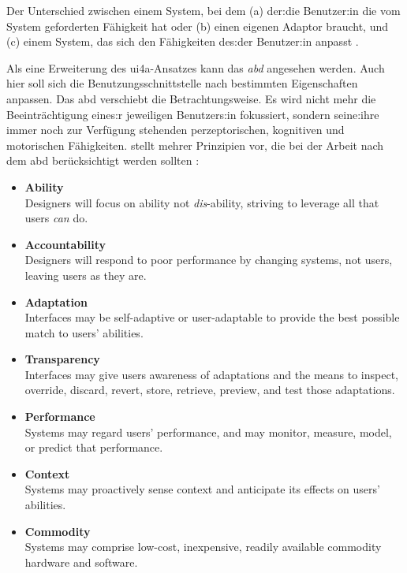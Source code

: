 \documentclass[sigchi-a,screen,nonacm,language=german]{acmart}
\theoremstyle{acmdefinition}
\begin{document}
\begin{marginfigure}
\begin{subfigure}[b]{\marginparwidth}
    \end{subfigure}

    \caption{Der Unterschied zwischen einem System, bei dem (a) der:die Benutzer:in die vom System geforderten Fähigkeit hat oder (b) einen eigenen Adaptor braucht, und (c) einem System, das sich den Fähigkeiten des:der Benutzer:in anpasst \citep[Eigene Darstellung nach][S.~4]{wobbrock-etal:ability-based-design:2011}.}
    \label{fig:adaptors}
\end{marginfigure}

Als eine Erweiterung des \ac{ui4a}-Ansatzes kann das \emph{\acf{abd}} angesehen werden. Auch hier soll sich die Benutzungsschnittstelle nach bestimmten Eigenschaften anpassen. Das \ac{abd} verschiebt die Betrachtungsweise. Es wird nicht mehr die Beeinträchtigung eines:r jeweiligen Benutzers:in fokussiert, sondern seine:ihre immer noch zur Verfügung stehenden perzeptorischen, kognitiven und motorischen Fähigkeiten. \citet{wobbrock-etal:ability-based-design:2011} stellt mehrer Prinzipien vor, die bei der Arbeit nach dem \ac{abd} berücksichtigt werden sollten   \citep[vgl.][]{wobbrock-etal-ability-based-design:2018,wobbrock-etal:ability-based-design:2011}:

\begin{itemize}
    \item \textbf{Ability} \\
        Designers will focus on ability not \emph{dis}-ability, striving to leverage all that users \emph{can} do.
    \item \textbf{Accountability} \\
        Designers will respond to poor performance by changing systems, not users, leaving users as they are.
    \item \textbf{Adaptation} \\
        Interfaces may be self-adaptive or user-adaptable to provide the best possible match to users’ abilities.
    \item \textbf{Transparency} \\
        Interfaces may give users awareness of adaptations and the means to inspect, override, discard, revert, store, retrieve, preview, and test those adaptations.
    \item \textbf{Performance} \\
        Systems may regard users’ performance, and may monitor, measure, model, or predict that performance.
    \item \textbf{Context} \\
        Systems may proactively sense context and anticipate its effects on users’ abilities.
    \item \textbf{Commodity} \\
        Systems may comprise low-cost, inexpensive, readily available commodity hardware and software.
\end{itemize}
\end{document}
